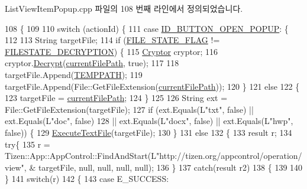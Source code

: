 List\+View\+Item\+Popup.\+cpp 파일의 108 번째 라인에서 정의되었습니다.


\begin{DoxyCode}
108                                                                              \{
109 
110     \textcolor{keywordflow}{switch} (actionId) \{
111     \textcolor{keywordflow}{case} \hyperlink{class_list_view_item_popup_a039ba26046cd62bd44d24d60fa0cc2f6}{ID\_BUTTON\_OPEN\_POPUP}: \{
112 
113         String targetFile;
114         \textcolor{keywordflow}{if} (\hyperlink{_list_view_item_popup_8cpp_a514e8b025bf71e7b0500f6f8efb635ce}{FILE\_STATE\_FLAG} != \hyperlink{class_list_view_item_popup_a8f4af33ad25eb4228734b49c521d052c}{FILESTATE\_DECRYPTION}) \{
115             \hyperlink{class_cryptor}{Cryptor} cryptor;
116             cryptor.\hyperlink{class_cryptor_a82e76152a3351f63ae517664187d5498}{Decrypt}(\hyperlink{class_list_view_item_popup_a395472f1d8380e5d2d9e18e80a90c3a7}{currentFilePath}, \textcolor{keyword}{true});
117 
118             targetFile.Append(\hyperlink{_folder_browser_8h_a536f167c46920a02a921ed149b74ddfc}{TEMPPATH});
119             targetFile.Append(File::GetFileExtension(\hyperlink{class_list_view_item_popup_a395472f1d8380e5d2d9e18e80a90c3a7}{currentFilePath}));
120         \}
121         \textcolor{keywordflow}{else}
122         \{
123             targetFile = \hyperlink{class_list_view_item_popup_a395472f1d8380e5d2d9e18e80a90c3a7}{currentFilePath};
124         \}
125 
126         String ext = File::GetFileExtension(targetFile);
127         \textcolor{keywordflow}{if} (ext.Equals(L\textcolor{stringliteral}{"txt"}, \textcolor{keyword}{false}) || ext.Equals(L\textcolor{stringliteral}{"doc"}, \textcolor{keyword}{false})
128                     || ext.Equals(L\textcolor{stringliteral}{"docx"}, \textcolor{keyword}{false}) || ext.Equals(L\textcolor{stringliteral}{"hwp"}, \textcolor{keyword}{false})) \{
129                 \hyperlink{class_list_view_item_popup_a56169532269cb6c8e3cd61ddd6e605ce}{ExecuteTextFile}(targetFile);
130         \}
131         \textcolor{keywordflow}{else}
132         \{
133             result r;
134             \textcolor{keywordflow}{try}\{
135             r = Tizen::App::AppControl::FindAndStart(L\textcolor{stringliteral}{"http://tizen.org/appcontrol/operation/view"}, &
      targetFile, null, null, null, null);
136             \}
137             \textcolor{keywordflow}{catch}(result r2)
138             \{
139 
140             \}
141             \textcolor{keywordflow}{switch}(r)
142             \{
143             \textcolor{keywordflow}{case} E\_SUCCESS:

\end{DoxyCode}
